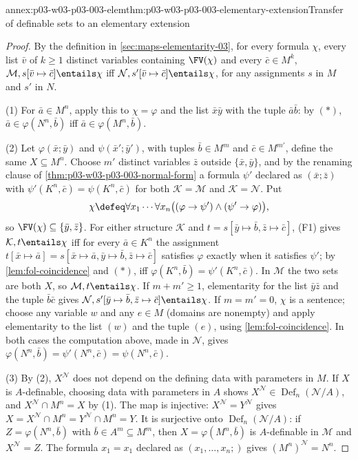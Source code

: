 \begin{annexitem}{annex:p03-w03-p03-003-elem}{thm:p03-w03-p03-003-elementary-extension}{Transfer of definable sets to an elementary extension}
\begin{proof}
By the definition in \cref{sec:maps-elementarity-03}, for every formula
\(\chi\), every list \(\bar v\) of \(k\geq1\) distinct variables containing
\(\FV(\chi)\) and every \(\bar c\in M^k\),
\(\mathcal M,s[\bar v\mapsto\bar c]\entails\chi\) iff
\(\mathcal N,s'[\bar v\mapsto\bar c]\entails\chi\), for any assignments
\(s\) in \(M\) and \(s'\) in \(N\).

(1) For \(\bar a\in M^n\), apply this to \(\chi=\varphi\) and the list
\(\bar x\bar y\) with the tuple \(\bar a\bar b\): by \((\ast)\),
\(\bar a\in\varphi(N^n,\bar b)\) iff \(\bar a\in\varphi(M^n,\bar b)\).

(2) Let \(\varphi(\bar x;\bar y)\) and \(\psi(\bar x';\bar y')\), with
tuples \(\bar b\in M^m\) and \(\bar c\in M^{m'}\), define the same
\(X\subseteq M^n\).  Choose \(m'\) distinct variables \(\bar z\) outside
\(\{\bar x,\bar y\}\), and by the renaming clause of
\cref{thm:p03-w03-p03-003-normal-form} a formula \(\psi'\) declared as
\((\bar x;\bar z)\) with \(\psi'(K^n,\bar c)=\psi(K^n,\bar c)\) for both
\(\mathcal K=\mathcal M\) and \(\mathcal K=\mathcal N\).  Put
\[
 \chi\defeq\forall x_1\cdots\forall x_n\bigl((\varphi\to\psi')\land
   (\psi'\to\varphi)\bigr),
\]
so \(\FV(\chi)\subseteq\{\bar y,\bar z\}\).  For either structure
\(\mathcal K\) and \(t=s[\bar y\mapsto\bar b,\bar z\mapsto\bar c]\), (F1)
gives \(\mathcal K,t\entails\chi\) iff for every \(\bar a\in K^n\) the
assignment \(t[\bar x\mapsto\bar a]=s[\bar x\mapsto\bar a,\bar y\mapsto
\bar b,\bar z\mapsto\bar c]\) satisfies \(\varphi\) exactly when it
satisfies \(\psi'\); by \cref{lem:fol-coincidence} and \((\ast)\), iff
\(\varphi(K^n,\bar b)=\psi'(K^n,\bar c)\).  In \(\mathcal M\) the two sets
are both \(X\), so \(\mathcal M,t\entails\chi\).  If \(m+m'\geq1\),
elementarity for the list \(\bar y\bar z\) and the tuple \(\bar b\bar c\)
gives \(\mathcal N,s'[\bar y\mapsto\bar b,\bar z\mapsto\bar c]\entails\chi\).
If \(m=m'=0\), \(\chi\) is a sentence; choose any variable \(w\) and any
\(e\in M\) (domains are nonempty) and apply elementarity to the list
\((w)\) and the tuple \((e)\), using \cref{lem:fol-coincidence}.  In both
cases the computation above, made in \(\mathcal N\), gives
\(\varphi(N^n,\bar b)=\psi'(N^n,\bar c)=\psi(N^n,\bar c)\).

(3) By (2), \(X^{\mathcal N}\) does not depend on the defining data with
parameters in \(M\).  If \(X\) is \(A\)-definable, choosing data with
parameters in \(A\) shows \(X^{\mathcal N}\in\operatorname{Def}_n
(\mathcal N/A)\), and \(X^{\mathcal N}\cap M^n=X\) by (1).  The map is
injective: \(X^{\mathcal N}=Y^{\mathcal N}\) gives
\(X=X^{\mathcal N}\cap M^n=Y^{\mathcal N}\cap M^n=Y\).  It is surjective
onto \(\operatorname{Def}_n(\mathcal N/A)\): if \(Z=\varphi(N^n,\bar b)\)
with \(\bar b\in A^m\subseteq M^m\), then \(X=\varphi(M^n,\bar b)\) is
\(A\)-definable in \(\mathcal M\) and \(X^{\mathcal N}=Z\).  The formula
\(x_1=x_1\) declared as \((x_1,\ldots,x_n;)\) gives
\((M^n)^{\mathcal N}=N^n\).


\end{proof}
\end{annexitem}
